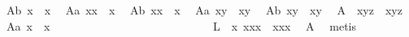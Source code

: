 \begin{isabellebody}
\isanewline
\ A{}b{\isacharcolon}\ {\isachardoublequoteopen}{\isasymbox}{\isacharparenleft}x{\isasymbox}{\isacharparenright}\ {\isasymapprox}\ {\isasymbox}x{\isachardoublequoteclose}\ \isanewline
\ A{}a{\isacharcolon}\ {\isachardoublequoteopen}{\isacharparenleft}{\isasymbox}x{\isacharparenright}{\isasymcdot}x\ {\isasymapprox}\ x{\isachardoublequoteclose}\ \isanewline
\ A{}b{\isacharcolon}\ {\isachardoublequoteopen}x{\isasymcdot}{\isacharparenleft}x{\isasymbox}{\isacharparenright}\ {\isasymapprox}\ x{\isachardoublequoteclose}\ \isanewline
\ A{}a{\isacharcolon}\ {\isachardoublequoteopen}{\isasymbox}{\isacharparenleft}x{\isasymcdot}y{\isacharparenright}\ {\isasymapprox}\ {\isasymbox}{\isacharparenleft}x{\isasymcdot}{\isacharparenleft}{\isasymbox}y{\isacharparenright}{\isacharparenright}{\isachardoublequoteclose}\ \isanewline
\ A{}b{\isacharcolon}\ {\isachardoublequoteopen}{\isacharparenleft}x{\isasymcdot}y{\isacharparenright}{\isasymbox}\ {\isasymapprox}\ {\isacharparenleft}{\isacharparenleft}x{\isasymbox}{\isacharparenright}{\isasymcdot}y{\isacharparenright}{\isasymbox}{\isachardoublequoteclose}\ \isanewline
\ A{}{\isacharcolon}\ \ {\isachardoublequoteopen}x{\isasymcdot}{\isacharparenleft}y{\isasymcdot}z{\isacharparenright}\ {\isasymapprox}\ {\isacharparenleft}x{\isasymcdot}y{\isacharparenright}{\isasymcdot}z{\isachardoublequoteclose}\isanewline
\isanewline
\isanewline
\isanewline
{}\isamarkupfalse%
\ A{}a{\isacharcolon}\ {\isachardoublequoteopen}{\isacharparenleft}{\isasymbox}x{\isacharparenright}{\isasymbox}\ {\isasymapprox}\ {\isasymbox}x{\isachardoublequoteclose}\ \isanewline
%
\isadelimproof
\ %
\endisadelimproof
%
\isatagproof
{}\isamarkupfalse%
\ {\isacharminus}\ \ \ \ \ \ \ \ \ \ \ \ \ \ \ \ \ \ \ \ \isanewline
\ \isamarkupfalse%
\ \ L{}{\isacharcolon}\ \ {\isachardoublequoteopen}{\isasymforall}x{\isachardot}\ {\isacharparenleft}{\isasymbox}{\isasymbox}x{\isacharparenright}{\isasymcdot}{\isacharparenleft}{\isacharparenleft}{\isasymbox}x{\isacharparenright}{\isasymcdot}x{\isacharparenright}\ {\isasymapprox}\ {\isacharparenleft}{\isacharparenleft}{\isasymbox}{\isasymbox}x{\isacharparenright}{\isasymcdot}{\isacharparenleft}{\isasymbox}x{\isacharparenright}{\isacharparenright}{\isasymcdot}x{\isachardoublequoteclose}\ \isamarkupfalse%
\ A{}\ \isamarkupfalse%
\ metis\isanewline
\ \isamarkupfalse%

\end{isabellebody}
